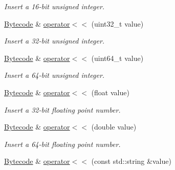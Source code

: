 \begin{DoxyCompactItemize}
\begin{DoxyCompactList}\small\item\em Insert a 16-\/bit unsigned integer. \end{DoxyCompactList}\item 
\hyperlink{classcreek_1_1_bytecode}{Bytecode} \& \hyperlink{classcreek_1_1_bytecode_ac6434e518ff6548cc652db9146ce8409}{operator$<$$<$} (uint32\+\_\+t value)\hypertarget{classcreek_1_1_bytecode_ac6434e518ff6548cc652db9146ce8409}{}\label{classcreek_1_1_bytecode_ac6434e518ff6548cc652db9146ce8409}

\begin{DoxyCompactList}\small\item\em Insert a 32-\/bit unsigned integer. \end{DoxyCompactList}\item 
\hyperlink{classcreek_1_1_bytecode}{Bytecode} \& \hyperlink{classcreek_1_1_bytecode_a18f790121b88063811aeeca6790a59be}{operator$<$$<$} (uint64\+\_\+t value)\hypertarget{classcreek_1_1_bytecode_a18f790121b88063811aeeca6790a59be}{}\label{classcreek_1_1_bytecode_a18f790121b88063811aeeca6790a59be}

\begin{DoxyCompactList}\small\item\em Insert a 64-\/bit unsigned integer. \end{DoxyCompactList}\item 
\hyperlink{classcreek_1_1_bytecode}{Bytecode} \& \hyperlink{classcreek_1_1_bytecode_a628840beae7c36bb3efb6d1e6b67de1c}{operator$<$$<$} (float value)\hypertarget{classcreek_1_1_bytecode_a628840beae7c36bb3efb6d1e6b67de1c}{}\label{classcreek_1_1_bytecode_a628840beae7c36bb3efb6d1e6b67de1c}

\begin{DoxyCompactList}\small\item\em Insert a 32-\/bit floating point number. \end{DoxyCompactList}\item 
\hyperlink{classcreek_1_1_bytecode}{Bytecode} \& \hyperlink{classcreek_1_1_bytecode_a5ea65c041c1c04a43304807cfd978f62}{operator$<$$<$} (double value)\hypertarget{classcreek_1_1_bytecode_a5ea65c041c1c04a43304807cfd978f62}{}\label{classcreek_1_1_bytecode_a5ea65c041c1c04a43304807cfd978f62}

\begin{DoxyCompactList}\small\item\em Insert a 64-\/bit floating point number. \end{DoxyCompactList}\item 
\hyperlink{classcreek_1_1_bytecode}{Bytecode} \& \hyperlink{classcreek_1_1_bytecode_a8692538df72f15b89516cb7898f857e1}{operator$<$$<$} (const std\+::string \&value)\hypertarget{classcreek_1_1_bytecode_a8692538df72f15b89516cb7898f857e1}{}\label{classcreek_1_1_bytecode_a8692538df72f15b89516cb7898f857e1}


\end{DoxyCompactItemize}

